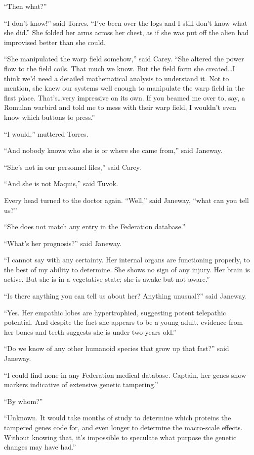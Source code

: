\documentclass[twoside,letterpaper,12pt]{memoir}
\begin{document}
``Then what?'' 

``I don't know!'' said Torres. ``I've been over the logs and I still don't know what she did.'' She folded her arms across her chest, as if she was put off the alien had improvised better than she could. 

``She manipulated the warp field somehow,'' said Carey. ``She altered the power flow to the field coils. That much we know. But the field form she created\ldots I think we'd need a detailed mathematical analysis to understand it. Not to mention, she knew our systems well enough to manipulate the warp field in the first place. That's\ldots very impressive on its own. If you beamed me over to, say, a Romulan warbird and told me to mess with their warp field, I wouldn't even know which buttons to press.'' 

``I would,'' muttered Torres. 

``And nobody knows who she is or where she came from,'' said Janeway. 

``She's not in our personnel files,'' said Carey. 

``And she is not Maquis,'' said Tuvok. 

Every head turned to the doctor again. ``Well,'' said Janeway, ``what can you tell us?'' 

``She does not match any entry in the Federation database.'' 

``What's her prognosis?'' said Janeway. 

``I cannot say with any certainty. Her internal organs are functioning properly, to the best of my ability to determine. She shows no sign of any injury. Her brain is active. But she is in a vegetative state; she is awake but not aware.'' 

``Is there anything you can tell us about her? Anything unusual?'' said Janeway. 

``Yes. Her empathic lobes are hypertrophied, suggesting potent telepathic potential. And despite the fact she appears to be a young adult, evidence from her bones and teeth suggests she is under two years old.'' 

``Do we know of any other humanoid species that grow up that fast?'' said Janeway. 

``I could find none in any Federation medical database. Captain, her genes show markers indicative of extensive genetic tampering.'' 

``By whom?'' 

``Unknown. It would take months of study to determine which proteins the tampered genes code for, and even longer to determine the macro-scale effects. Without knowing that, it's impossible to speculate what purpose the genetic changes may have had.'' 
\end{document}
